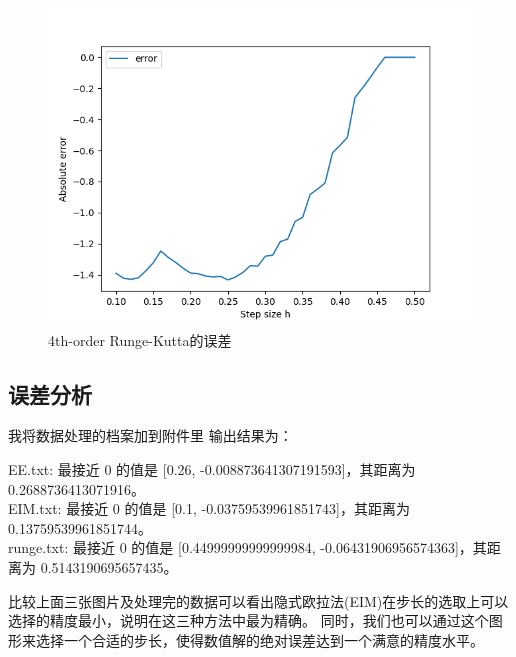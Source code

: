 \documentclass[12pt, a4paper, oneside]{ctexart}
\begin{document}
\begin{spacing}{2.0}
\begin{figure}[H]
      \begin{minipage}[t]{0.5\linewidth}
        \centering
        \includegraphics[scale=0.3]{Runge_Kutta4 ddd.png}
        \caption{4th-order Runge-Kutta的误差}
        \label{fig:side:b}
      \end{minipage}
\end{figure}
\subsection{误差分析}
我将数据处理的档案加到附件里
输出结果为：
\begin{center}
    EE.txt: 最接近 0 的值是 [0.26, -0.008873641307191593]，其距离为 0.2688736413071916。\\
    EIM.txt: 最接近 0 的值是 [0.1, -0.03759539961851743]，其距离为 0.13759539961851744。\\
    runge.txt: 最接近 0 的值是 [0.44999999999999984, -0.06431906956574363]，其距离为 0.5143190695657435。
\end{center}
比较上面三张图片及处理完的数据可以看出隐式欧拉法(EIM)在步长的选取上可以选择的精度最小，说明在这三种方法中最为精确。
同时，我们也可以通过这个图形来选择一个合适的步长，使得数值解的绝对误差达到一个满意的精度水平。

\end{spacing}
\end{document}
